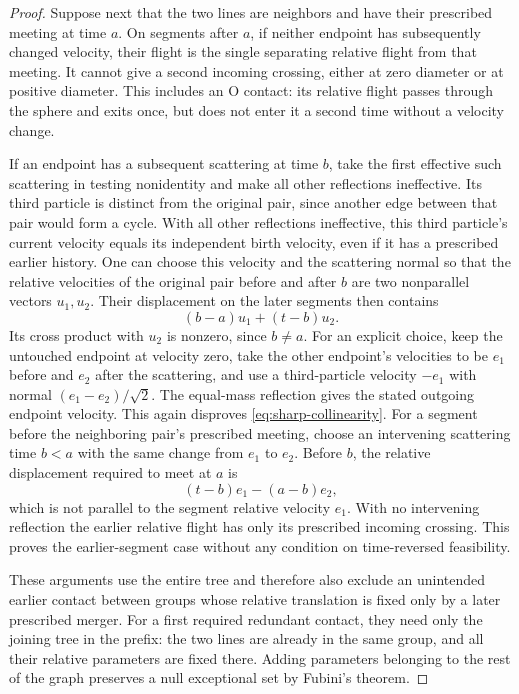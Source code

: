 \begin{proof}
Suppose next that the two lines are neighbors and have their
prescribed meeting at time \(a\).  On segments after \(a\), if
neither endpoint has subsequently changed velocity, their flight
is the single separating relative flight from that meeting.  It
cannot give a second incoming crossing, either at zero diameter
or at positive diameter.  This includes an O contact: its relative
flight passes through the sphere and exits once, but does not
enter it a second time without a velocity change.

If an endpoint has a subsequent scattering at time \(b\), take
the first effective such scattering in testing nonidentity and
make all other reflections ineffective.  Its third particle is
distinct from the original pair, since another edge between that
pair would form a cycle.  With all other reflections ineffective,
this third particle's current velocity equals its independent birth
velocity, even if it has a prescribed earlier history.  One can choose
this velocity and the scattering normal so that the relative
velocities of the original pair before and after \(b\) are two
nonparallel vectors \(u_1,u_2\).  Their displacement on the later
segments then contains
\[
                   (b-a)u_1+(t-b)u_2.
\]
Its cross product with \(u_2\) is nonzero, since \(b\ne a\).
For an explicit choice, keep the untouched endpoint at velocity
zero, take the other endpoint's velocities to be \(e_1\) before
and \(e_2\) after the scattering, and use a third-particle velocity
\(-e_1\) with normal \((e_1-e_2)/\sqrt2\).  The equal-mass
reflection gives the stated outgoing endpoint velocity.  This
again disproves \eqref{eq:sharp-collinearity}.  For a segment before
the neighboring pair's prescribed meeting, choose an intervening
scattering time \(b<a\) with the same change from \(e_1\) to
\(e_2\).  Before \(b\), the relative displacement required to
meet at \(a\) is
\[
                 (t-b)e_1-(a-b)e_2,
\]
which is not parallel to the segment relative velocity \(e_1\).
With no intervening reflection the earlier relative flight has
only its prescribed incoming crossing.  This proves the
earlier-segment case without any condition on time-reversed
feasibility.

These arguments use the entire tree and therefore also exclude an
unintended earlier contact between groups whose relative translation
is fixed only by a later prescribed merger.  For a first required
redundant contact, they need only the joining tree in the prefix:
the two lines are already in the same group, and all their relative
parameters are fixed there.  Adding parameters belonging to the
rest of the graph preserves a null exceptional set by Fubini's
theorem.


\end{proof}
